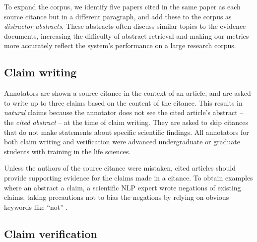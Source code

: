 To expand the corpus, we identify five papers cited in the same paper as each source citance but in a different paragraph, and add these to the corpus as \emph{distractor abstracts}. These abstracts often discuss similar topics to the evidence documents, increasing the difficulty of abstract retrieval and making our metrics more accurately reflect the system's performance on a large research corpus.




\subsection{Claim writing} \label{sec:claim_writing}
Annotators are shown a source citance in the context of an article, and are asked to write up to three claims based on the content of the citance. This results in \emph{natural} claims because the annotator does not see the cited article's abstract -- the \emph{cited abstract} -- at the time of claim writing. They are asked to skip citances that do not make statements about specific scientific findings. All annotators for both claim writing and verification were advanced undergraduate or graduate students with training in the life sciences.


\vspace{.2cm}  Unless the authors of the source citance were mistaken, cited articles should provide supporting evidence for the claims made in a citance. To obtain examples where an abstract  a claim, a scientific NLP expert wrote negations of existing claims, taking precautions not to bias the negations by relying on obvious keywords like ``not'' \cite{Schuster2019TowardsDF}.



\subsection{Claim verification}
\label{sec:claim_verification}

